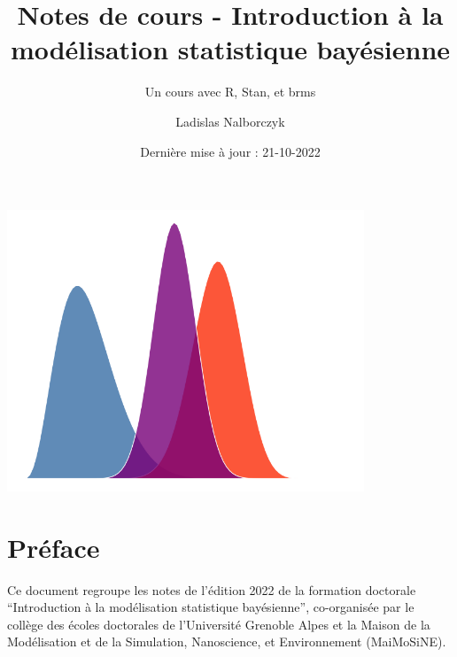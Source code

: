 \documentclass[
  a4paper,11pt,twoside,onecolumn,openright,final,oldfontcommands]{memoir}
\title{Notes de cours - Introduction à la modélisation statistique bayésienne}
\subtitle{Un cours avec R, Stan, et brms}
\author{Ladislas Nalborczyk}
\date{Dernière mise à jour : 21-10-2022}
\newcommand\blankpage{%
    \null
    \thispagestyle{empty}%
    \newpage
    }
\theoremstyle{definition}
\theoremstyle{definition}
\theoremstyle{definition}
\theoremstyle{definition}
\theoremstyle{remark}
\begin{document}
\maketitle


\thispagestyle{empty}


\begin{center} %

  \includegraphics[width=0.8\textwidth]{figures/cover_distributions.png}

\end{center}

\newpage
\blankpage %

\OnehalfSpacing %


{
\hypersetup{linkcolor=}
\setcounter{tocdepth}{2}
\tableofcontents
}
\hypertarget{pruxe9face}{%
\chapter*{Préface}\label{pruxe9face}}


Ce document regroupe les notes de l'édition 2022 de la formation doctorale ``Introduction à la modélisation statistique bayésienne'', co-organisée par le collège des écoles doctorales de l'Université Grenoble Alpes et la Maison de la Modélisation et de la Simulation, Nanoscience, et Environnement (MaiMoSiNE).
\end{document}
